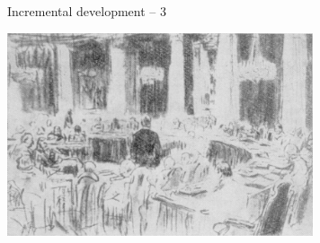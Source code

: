 \documentclass{beamer}
\begin{document}
\begin{frame}
{\centerline{Incremental development -- 3}}

\begin{center}
\includegraphics[width=9cm]{P2023.AIBCCSS.Drawing/repin_sketch.jpg}
\end{center}

\end{frame}
\end{document}
